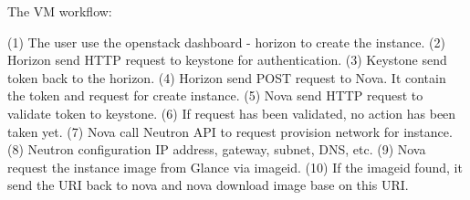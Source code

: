 The VM workflow:

(1) The user use the openstack dashboard - horizon to create the instance.
(2) Horizon send HTTP request to keystone for authentication.
(3) Keystone send token back to the horizon.
(4) Horizon send POST request to Nova. It contain the token and request for create instance.
(5) Nova send HTTP request to validate token to keystone.
(6) If request has been validated, no action has been taken yet.
(7) Nova call Neutron API to request provision network for instance.
(8) Neutron configuration IP address, gateway, subnet, DNS, etc.
(9) Nova request the instance image from Glance via imageid.
(10) If the imageid found, it send the URI back to nova and nova download image base on this URI.
